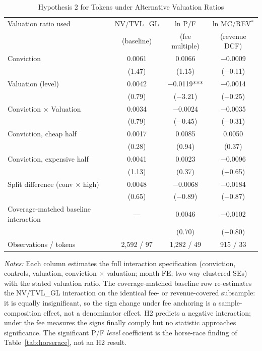 \documentclass[12pt]{article}
\begin{document}
\begin{table}[ht]
\centering
\caption{Hypothesis 2 for Tokens under Alternative Valuation Ratios}
\label{tab:h2altval}
\small
\begin{tabular}{lccc}
\toprule
Valuation ratio used & NV/TVL\_GL & ln P/F & ln MC/REV$^*$ \\
 & (baseline) & (fee multiple) & (revenue DCF) \\
\midrule
Conviction & 0.0061 & 0.0066 & $-$0.0009 \\
 & (1.47) & (1.15) & ($-$0.11) \\
Valuation (level) & 0.0042 & $-$0.0119*** & $-$0.0014 \\
 & (0.79) & ($-$3.21) & ($-$0.25) \\
Conviction $\times$ Valuation & 0.0034 & $-$0.0024 & $-$0.0035 \\
 & (0.79) & ($-$0.45) & ($-$0.31) \\
\midrule
Conviction, cheap half & 0.0017 & 0.0085 & 0.0050 \\
 & (0.28) & (0.94) & (0.37) \\
Conviction, expensive half & 0.0041 & 0.0023 & $-$0.0096 \\
 & (1.13) & (0.37) & ($-$0.65) \\
Split difference (conv $\times$ high) & 0.0048 & $-$0.0068 & $-$0.0184 \\
 & (0.65) & ($-$0.89) & ($-$0.87) \\
\midrule
Coverage-matched baseline interaction & --- & 0.0046 & $-$0.0102 \\
 & & (0.70) & ($-$0.80) \\
Observations / tokens & 2,592 / 97 & 1,282 / 49 & 915 / 33 \\
\bottomrule
\end{tabular}
\smallskip

\parbox{0.92\linewidth}{\footnotesize
\textit{Notes:} Each column estimates the full interaction specification (conviction,
controls, valuation, conviction $\times$ valuation; month FE; two-way clustered SEs)
with the stated valuation ratio. The coverage-matched baseline row re-estimates the
NV/TVL\_GL interaction on the identical fee- or revenue-covered subsample: it is
equally insignificant, so the sign change under fee anchoring is a sample-composition
effect, not a denominator effect. H2 predicts a negative interaction; under the fee
measures the signs finally comply but no statistic approaches significance. The
significant P/F \textit{level} coefficient is the horse-race finding of
Table~\ref{tab:horserace}, not an H2 result.}
\end{table}
\end{document}
